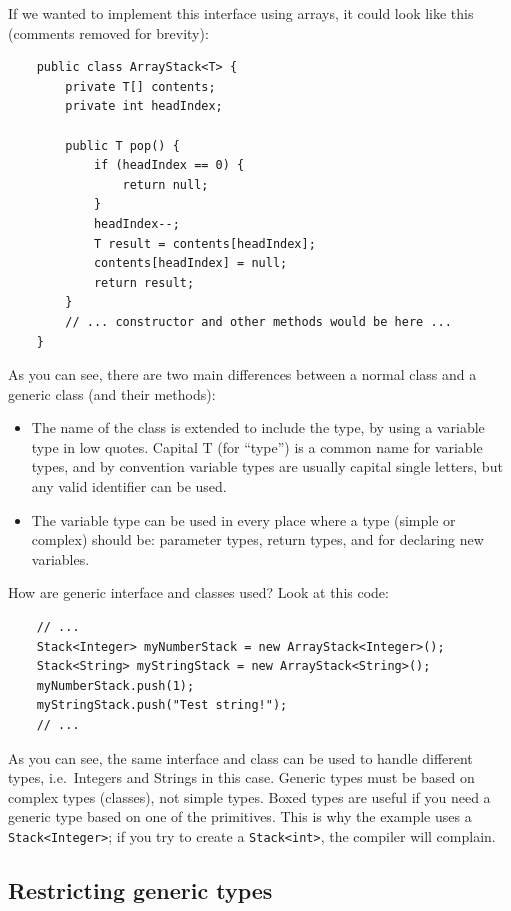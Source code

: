 If we wanted to implement this interface using arrays, it could look
like this (comments removed for brevity): 

\begin{verbatim}
    public class ArrayStack<T> {
        private T[] contents;
        private int headIndex; 

        public T pop() {
            if (headIndex == 0) {
                return null;
            }
            headIndex--;
            T result = contents[headIndex];
            contents[headIndex] = null;
            return result;
        }
        // ... constructor and other methods would be here ...
    }
\end{verbatim}

As you can see, there are two main differences between a normal class
and a generic class (and their methods): 

\begin{itemize}
\item The name of the class is extended to include the type, by using
  a variable type in low quotes. Capital T (for ``type'') is a common
  name for variable types, and by convention variable types are
  usually capital single letters, but any valid identifier can be
  used.
\item The variable type can be used in every place where a type
  (simple or complex) should be: parameter types, return types, and
  for declaring new variables. 
\end{itemize}

How are generic interface and classes used? Look at this code:

\begin{verbatim}
    // ...
    Stack<Integer> myNumberStack = new ArrayStack<Integer>();
    Stack<String> myStringStack = new ArrayStack<String>();
    myNumberStack.push(1);
    myStringStack.push("Test string!");
    // ...
\end{verbatim}

As you can see, the same interface and class can be used to handle
different types, i.e.~Integers and Strings in this case. Generic types
must be based on complex types (classes), not simple types. Boxed
types are useful if you need a generic type based on one of the
primitives. This is why the example uses a \verb+Stack<Integer>+; if you try
to create a \verb+Stack<int>+, the compiler will complain. 

\subsection{Restricting generic types}
\label{sec:restr-gener-types}

